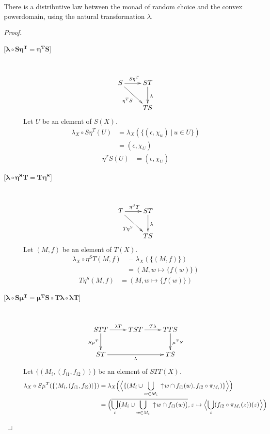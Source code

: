 \begin{proposition}
There is a distributive law between the monad of random choice and the convex powerdomain, using the natural transformation $\lambda$.
\end{proposition}
\begin{proof}
\begin{description}
\item[{[}$\boldsymbol{\lambda\circ S\eta^T = \eta^T S}${]}] \hfill \\
\[
\xymatrix{
S\ar[r]^{S\eta^T}\ar[dr]_{\eta^T S} & ST\ar[d]^\lambda \\
& TS
}
\]
Let $U$ be an element of $S(X)$.
\begin{align*}
\lambda_X \circ S\eta^T (U) &= \lambda_X (\{(\epsilon, \chi_u)\ |\ u\in U\}) \\
&= (\epsilon, \chi_U)
\end{align*}
\begin{align*}
\eta^T S(U) &= (\epsilon, \chi_U)
\end{align*}
\item[{[}$\boldsymbol{\lambda\circ \eta^S T = T\eta^S}${]}] \hfill \\
\[
\xymatrix{
T\ar[r]^{\eta^S T}\ar[dr]_{T\eta^S} & ST\ar[d]^\lambda \\
& TS
}
\]
Let $(M,f)$ be an element of $T(X)$.
\begin{align*}
\lambda_X \circ \eta^S T (M,f) &= \lambda_X (\{(M,f)\}) \\
&= (M, w\mapsto\{f(w)\})
\end{align*}
\begin{align*}
T\eta^S (M,f) &= (M,w\mapsto\{f(w)\})
\end{align*}
\item[{[}$\boldsymbol{\lambda\circ S\mu^T = \mu^T S\circ T\lambda\circ\lambda T}${]}] \hfill \\
\[
\xymatrix{
STT\ar[r]^{\lambda T}\ar[d]_{S\mu^T} & TST\ar[r]^{T\lambda} & TTS\ar[d]^{\mu^T S} \\
ST\ar[rr]_\lambda & & TS
}
\]
Let $\{(M_i, (f_{i1}, f_{i2}))\}$ be an element of $STT(X)$.
\begin{align*}
\lambda_X\circ S\mu^T (\{(M_i, (f_{i1}, f_{i2}))\}) &= \lambda_X \Bigl(\Bigl\langle\{(M_i\cup \bigcup_{w\in M_i} \ua w \cap f_{i1}(w), f_{i2} \circ \pi_{M_i})\}\Bigr\rangle\Bigr) \\
&= \Bigl(\overline{\bigcup_i\bigl(M_i\cup \bigcup_{w\in M_i} \ua w \cap f_{i1}(w)\bigr)}, z\mapsto\Bigl\langle\bigcup_i (f_{i2}\circ \pi_{M_i}(z))(z)\Bigr\rangle\Bigr) \\

\end{align*}
\end{description}
\end{proof}
